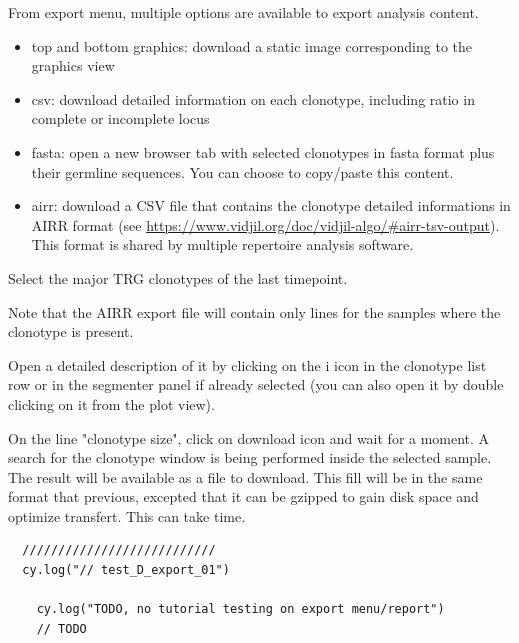 From export menu, multiple options are available to export analysis content.
\begin{itemize}
  \item top and bottom graphics:  download a static image corresponding to the graphics view
  \item csv:  download detailed information on each clonotype, including ratio in
complete or incomplete locus %
  \item fasta: open a new browser tab with selected clonotypes in fasta format plus their germline sequences. You can choose to copy/paste this content.
  \item airr: download a CSV file that contains the clonotype detailed
informations in AIRR format (see \url{https://www.vidjil.org/doc/vidjil-algo/#airr-tsv-output}). This format is shared by multiple repertoire analysis software. 
\end{itemize}

Select the major TRG clonotypes of the last timepoint.

Note that the AIRR export file will contain only lines for the samples where the clonotype is present.



Open a detailed description of it by clicking on the {i icon} in the clonotype list row or in the segmenter panel if already selected (you can also open it by double clicking on it from the plot view).


On the line "clonotype size", click on download icon and wait for a moment. 
A search for the clonotype window is being performed inside the selected sample. The result will be available as a file to download. 
This fill will be in the same format that previous, excepted that it can be gzipped to gain disk space and optimize transfert.
This can take time. 

\begin{verbatim}
  ///////////////////////////
  cy.log("// test_D_export_01")

    cy.log("TODO, no tutorial testing on export menu/report")
    // TODO

\end{verbatim}
